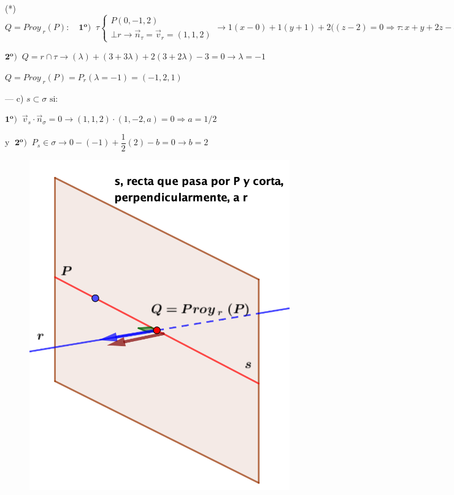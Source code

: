 \begin{proofw}
\noindent (*) $Q=Proy_{\;r}(P):\quad \boldsymbol{1^o)}\;\;\tau\begin{cases}P(0,-1,2)\\ \bot r\to \vec n_{\tau}=\vec v_r=(1,1,2)\end{cases} \to 1(x-0)+1(y+1)+2((z-2)=0 \Rightarrow \tau: x+y+2z-3=0$

\noindent $ \boldsymbol{2^o)}\;\; Q=r\cap \tau \to (\lambda)+(3+3\lambda)+2(3+2\lambda)-3=0 \to \lambda=-1$

\noindent $Q=Proy_{\;r}(P)=P_r(\lambda=-1)=(-1,2,1)$

\noindent --- c) $s\subset \sigma \text{ si:}$ 

\noindent $\boldsymbol{1^o)}\;\; \vec v_s \cdot \vec n_{\sigma}=0 \to (1,1,2)\cdot (1,-2,a)=0 \Rightarrow a=1/2$

\noindent y $\; \boldsymbol{2^o)}\;\; P_s\in\sigma \to 0-(-1)+\dfrac 1 2 (2)-b=0 \to b=2$
\end{proofw}

\begin{figure}[H]
		\centering
		\includegraphics[width=.6\textwidth]{imagenes/imagenes11/T11IM32.png}
	\end{figure}

